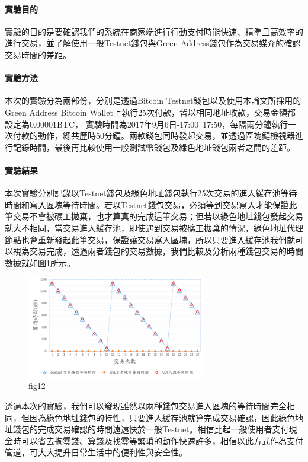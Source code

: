			\paragraph{實驗目的}實驗的目的是要確認我們的系統在商家端進行行動支付時能快速、精準且高效率的進行交易，並了解使用一般Testnet錢包與Green Address錢包作為交易媒介的確認交易時間的差距。

			\paragraph{實驗方法}本次的實驗分為兩部份，分別是透過Bitcoin Testnet錢包以及使用本論文所採用的Green Address Bitcoin Wallet上執行25次付款，皆以相同地址收款，交易金額都設定為0.00001BTC， 實驗時間為2017年9月6日-17:00~17:50，每隔兩分鐘執行一次付款的動作，總共歷時50分鐘。兩款錢包同時發起交易，並透過區塊鏈檢視器進行記錄時間，最後再比較使用一般測試幣錢包及綠色地址錢包兩者之間的差距。

			\paragraph{實驗結果}本次實驗分別記錄以Testnet錢包及綠色地址錢包執行25次交易的進入緩存池等待時間和寫入區塊等待時間。若以Testnet錢包交易，必須等到交易寫入才能保證此筆交易不會被礦工拋棄，也才算真的完成這筆交易；但若以綠色地址錢包發起交易就大不相同，當交易進入緩存池，即使遇到交易被礦工拋棄的情況，綠色地址代理節點也會重新發起此筆交易，保證讓交易寫入區塊，所以只要進入緩存池我們就可以視為交易完成，透過兩者錢包的交易數據，我們比較及分析兩種錢包交易的時間數據就如圖\ref{fig12}所示。


			\begin{figure}[h]
				\centering
				\includegraphics[width = 0.7\textwidth]{fig12.png}
				\caption{fig12}\label{fig12}
			\end{figure}

		透過本次的實驗，我們可以發現雖然以兩種錢包交易進入區塊的等待時間完全相同，但因為綠色地址錢包的特性，只要進入緩存池就算完成交易確認，因此綠色地址錢包的完成交易確認的時間遠遠快於一般Testnet。相信比起一般使用者支付現金時可以省去掏零錢、算錢及找零等繁瑣的動作快速許多，相信以此方式作為支付管道，可大大提升日常生活中的便利性與安全性。


    
